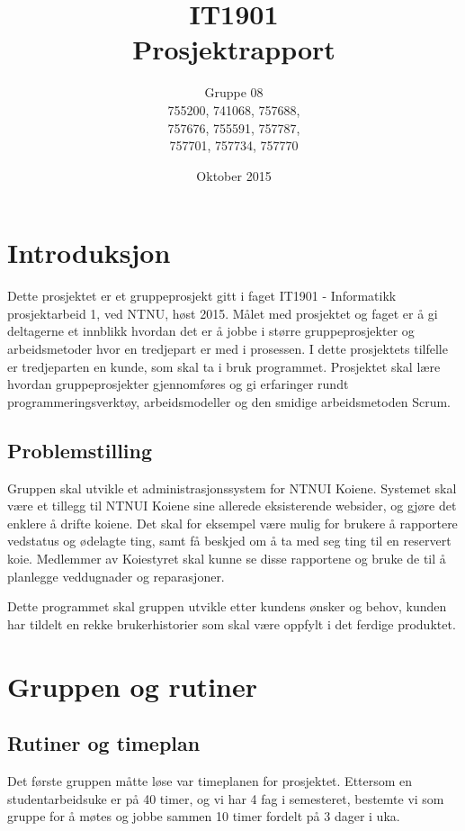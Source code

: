\documentclass[12pt,a4paper,norsk]{article}
\title{IT1901 \\ Prosjektrapport}
\author{Gruppe 08 \\ 
    755200, 741068, 757688,\\
    757676, 755591, 757787, \\
    757701, 757734, 757770}
\date{Oktober 2015}
\begin{document}
	\maketitle
	\newpage
	\tableofcontents
	\newpage
	\section{Introduksjon}


Dette prosjektet er et gruppeprosjekt gitt i faget IT1901 - Informatikk prosjektarbeid 1, ved NTNU, høst 2015. Målet med prosjektet og faget er å gi deltagerne et innblikk hvordan det er å jobbe i større gruppeprosjekter og arbeidsmetoder hvor en tredjepart er med i prosessen. I dette prosjektets tilfelle er tredjeparten en kunde, som skal ta i bruk programmet. Prosjektet skal lære hvordan gruppeprosjekter gjennomføres og gi erfaringer rundt programmeringsverktøy, arbeidsmodeller og den smidige arbeidsmetoden Scrum.

\subsection{Problemstilling}

Gruppen skal utvikle et administrasjonssystem for NTNUI Koiene. Systemet skal være et tillegg til NTNUI Koiene sine allerede eksisterende websider, og gjøre det enklere å drifte koiene. Det skal for eksempel være mulig for brukere å rapportere vedstatus og ødelagte ting, samt få beskjed om å ta med seg ting til en reservert koie. Medlemmer av Koiestyret skal kunne se disse rapportene og bruke de til å planlegge veddugnader og reparasjoner.

Dette programmet skal gruppen utvikle etter kundens ønsker og behov, kunden har tildelt en rekke brukerhistorier som skal være oppfylt i det ferdige produktet.

	\section{Gruppen og rutiner}
	
\subsection{Rutiner og timeplan}

Det første gruppen måtte løse var timeplanen for prosjektet. Ettersom en studentarbeidsuke er på 40 timer, og vi har 4 fag i semesteret, bestemte vi som gruppe for å møtes og jobbe sammen 10 timer fordelt på 3 dager i uka.
\end{document}
